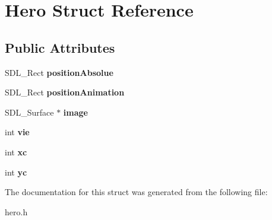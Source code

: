 \hypertarget{structHero}{}\section{Hero Struct Reference}
\label{structHero}
\subsection*{Public Attributes}
\begin{DoxyCompactItemize}
\item 
S\+D\+L\+\_\+\+Rect {\bfseries position\+Absolue}\hypertarget{structHero_aa174bc07ff82afb25c521fc15a61f185}{}\label{structHero_aa174bc07ff82afb25c521fc15a61f185}

\item 
S\+D\+L\+\_\+\+Rect {\bfseries position\+Animation}\hypertarget{structHero_ab1c032e99b2742176acc883789ee4b91}{}\label{structHero_ab1c032e99b2742176acc883789ee4b91}

\item 
S\+D\+L\+\_\+\+Surface $\ast$ {\bfseries image}\hypertarget{structHero_a3770973cf39e7634c1d98327508ca4e6}{}\label{structHero_a3770973cf39e7634c1d98327508ca4e6}

\item 
int {\bfseries vie}\hypertarget{structHero_a9c630540786c982a47e0837550cf6405}{}\label{structHero_a9c630540786c982a47e0837550cf6405}

\item 
int {\bfseries xc}\hypertarget{structHero_a78131e7f4f093f216f4487c8594a1702}{}\label{structHero_a78131e7f4f093f216f4487c8594a1702}

\item 
int {\bfseries yc}\hypertarget{structHero_a17f241daf2d4a9e63655e0229314cf45}{}\label{structHero_a17f241daf2d4a9e63655e0229314cf45}

\end{DoxyCompactItemize}


The documentation for this struct was generated from the following file\+:\begin{DoxyCompactItemize}
\item 
hero.\+h\end{DoxyCompactItemize}
